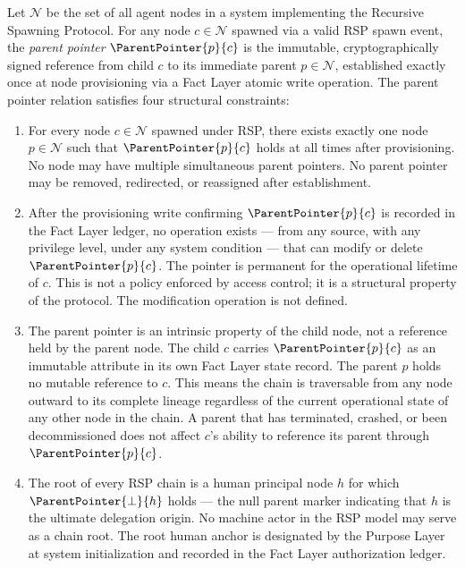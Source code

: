 \begin{dfn}
\label{dfn:parent-pointer}
Let $\mathcal{N}$ be the set of all agent nodes in a \bxthree{} system implementing the Recursive Spawning Protocol. For any node $c \in \mathcal{N}$ spawned via a valid RSP spawn event, the \emph{parent pointer} $\ParentPointer{p}{c}$ is the immutable, cryptographically signed reference from child $c$ to its immediate parent $p \in \mathcal{N}$, established exactly once at node provisioning via a Fact Layer atomic write operation. The parent pointer relation satisfies four structural constraints:

\begin{enumerate}
    \item[(P1) \textbf{Uniqueness}] For every node $c \in \mathcal{N}$ spawned under RSP, there exists exactly one node $p \in \mathcal{N}$ such that $\ParentPointer{p}{c}$ holds at all times after provisioning. No node may have multiple simultaneous parent pointers. No parent pointer may be removed, redirected, or reassigned after establishment.

    \item[(P2) \textbf{Immutability}] After the provisioning write confirming $\ParentPointer{p}{c}$ is recorded in the Fact Layer ledger, no operation exists — from any source, with any privilege level, under any system condition — that can modify or delete $\ParentPointer{p}{c}$. The pointer is permanent for the operational lifetime of $c$. This is not a policy enforced by access control; it is a structural property of the protocol. The modification operation is not defined.

    \item[(P3) \textbf{Directionality}] The parent pointer is an intrinsic property of the child node, not a reference held by the parent node. The child $c$ carries $\ParentPointer{p}{c}$ as an immutable attribute in its own Fact Layer state record. The parent $p$ holds no mutable reference to $c$. This means the chain is traversable from any node outward to its complete lineage regardless of the current operational state of any other node in the chain. A parent that has terminated, crashed, or been decommissioned does not affect $c$'s ability to reference its parent through $\ParentPointer{p}{c}$.

    \item[(P4) \textbf{Human Anchor Termination}] The root of every RSP chain is a human principal node $h$ for which $\ParentPointer{\bot}{h}$ holds — the null parent marker indicating that $h$ is the ultimate delegation origin. No machine actor in the RSP model may serve as a chain root. The root human anchor is designated by the Purpose Layer at system initialization and recorded in the Fact Layer authorization ledger.
\end{enumerate}
\end{dfn}

